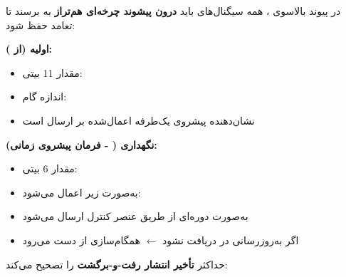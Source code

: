 

\CNchained{}

در پیوند بالاسوی ، همه سیگنال‌های  باید \textbf{درون پیشوند چرخه‌ای هم‌تراز} به  برسند تا تعامد حفظ شود:



\textbf{ اولیه (از ):}

\begin{itemize}
\tightlist
\item
  مقدار 11 بیتی: 
\item
  اندازه گام: 
\item
  نشان‌دهنده پیشروی یک‌طرفه اعمال‌شده بر ارسال  است
\end{itemize}

\textbf{نگهداری  ( - فرمان پیشروی زمانی):}

\begin{itemize}
\tightlist
\item
  مقدار 6 بیتی: 
\item
  به‌صورت زیر اعمال می‌شود: 
\item
  به‌صورت دوره‌ای از طریق عنصر کنترل  ارسال می‌شود
\item
  اگر به‌روزرسانی  در  دریافت نشود \ensuremath{\leftarrow} همگام‌سازی  از دست می‌رود
\end{itemize}



حداکثر  \textbf{تأخیر انتشار رفت-و-برگشت} را تصحیح می‌کند:


